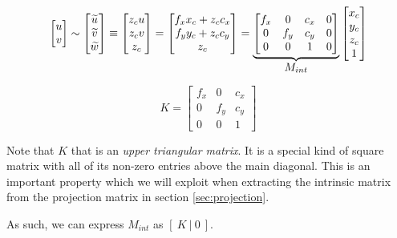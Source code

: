 \begin{equation}
    \begin{bmatrix}
        u \\ v
    \end{bmatrix}
    \sim
    \begin{bmatrix}
        \widetilde{u} \\ \widetilde{v} \\ \widetilde{w}
    \end{bmatrix}
    \equiv
    \begin{bmatrix}
        z_c u \\ z_c v \\ z_c
    \end{bmatrix}
    =
    \begin{bmatrix}
        f_x x_c + z_c c_x \\ f_y y_c + z_c c_y \\ z_c
    \end{bmatrix}
    =
    \underbrace{
        \begin{bmatrix}
            f_x & 0   & c_x & 0 \\
            0   & f_y & c_y & 0 \\
            0   & 0   & 1   & 0
        \end{bmatrix}
    }_{\mathlarger{M_{int}}}
    \begin{bmatrix}
        x_c \\ y_c \\ z_c \\ 1
    \end{bmatrix}
\end{equation}


\begin{equation}
    K =
    \begin{bmatrix}
        f_x & 0   & c_x \\
        0   & f_y & c_y \\
        0   & 0   & 1
    \end{bmatrix}
\end{equation}

Note that $K$ that is an \emph{upper triangular matrix}. It is a special kind of square matrix with all of its non-zero entries above the main diagonal. This is an important property which we will exploit when extracting the intrinsic matrix from the projection matrix in section \ref{sec:projection}.

As such, we can express $M_{int}$ as $\left[\: K \:\vert\: 0 \:\right]$.

